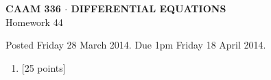 \documentclass[10pt]{article}
\begin{document}
\vspace*{-5em}
\begin{center}
\large \textsf{\textbf{CAAM 336 $\cdot$ DIFFERENTIAL EQUATIONS}\\[0.5em]
Homework 44 }
\end{center}

Posted Friday 28 March 2014.  Due 1pm Friday 18 April 2014.

\begin{enumerate}\addtocounter{enumi}{43}
\item {[25 points]}  
\end{enumerate}
\end{document}

